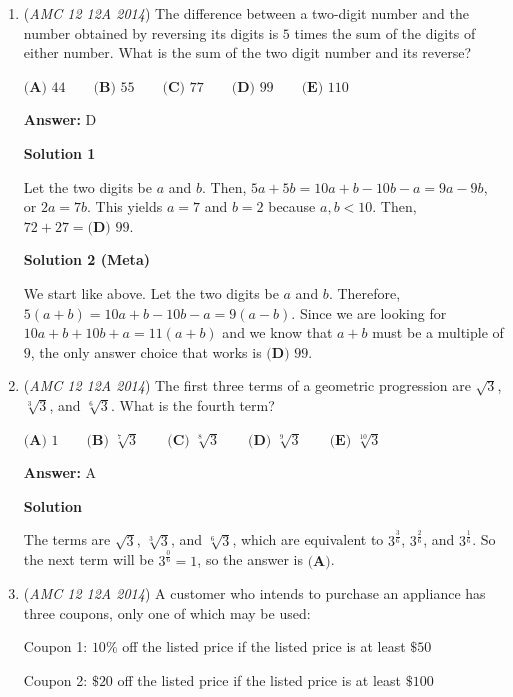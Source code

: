 \begin{enumerate}
	\item (\textit{AMC 12 12A 2014}) The difference between a two-digit number and the number obtained by reversing its digits is $5$ times the sum of the digits of either number.  What is the sum of the two digit number and its reverse?


 $\textbf{(A) }44\qquad \textbf{(B) }55\qquad \textbf{(C) }77\qquad \textbf{(D) }99\qquad \textbf{(E) }110$

 \textbf{Answer: }D



\textbf{Solution 1}

Let the two digits be $a$ and $b$. Then, $5a + 5b = 10a + b - 10b - a = 9a - 9b$, or $2a = 7b$. This yields $a = 7$ and $b = 2$ because $a, b < 10$. Then, $72 + 27 = \boxed{\textbf{(D) }99}.$




\textbf{Solution 2 (Meta)}

We start like above. Let the two digits be $a$ and $b$. Therefore, $5(a+b) = 10a+b-10b-a=9(a-b)$. Since we are looking for $10a+b+10b+a=11(a+b)$ and we know that $a+b$ must be a multiple of $9$, the only answer choice that works is $\boxed{\textbf{(D) }99}.$



	\item (\textit{AMC 12 12A 2014}) The first three terms of a geometric progression are $\sqrt 3$, $\sqrt[3]3$, and $\sqrt[6]3$.  What is the fourth term?


 $\textbf{(A) }1\qquad \textbf{(B) }\sqrt[7]3\qquad \textbf{(C) }\sqrt[8]3\qquad \textbf{(D) }\sqrt[9]3\qquad \textbf{(E) }\sqrt[10]3\qquad$

 \textbf{Answer: }A



\textbf{Solution}

The terms are  $\sqrt 3$, $\sqrt[3]3$, and $\sqrt[6]3$, which are equivalent to $3^{\frac{3}{6}}$, $3^{\frac{2}{6}}$, and $3^{\frac{1}{6}}$.  So the next term will be $3^{\frac{0}{6}}=1$, so the answer is $\boxed{\textbf{(A)}}$.

 


	\item (\textit{AMC 12 12A 2014}) A customer who intends to purchase an appliance has three coupons, only one of which may be used:


 Coupon 1: $10\%$ off the listed price if the listed price is at least $\$50$


 Coupon 2: $\$20$ off the listed price if the listed price is at least $\$100$



\end{enumerate}
